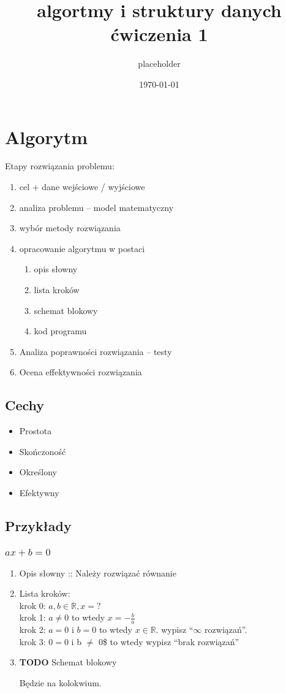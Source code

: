 \documentclass[11pt]{article}
\author{placeholder}
\date{\today}
\title{algortmy i struktury danych ćwiczenia 1}
\begin{document}
\maketitle
\section{Algorytm}
\label{sec:org84e7213}
Etapy rozwiązania problemu:
\begin{enumerate}
\item cel + dane wejściowe / wyjściowe
\item analiza problemu -- model matematyczny
\item wybór metody rozwiązania
\item opracowanie algorytmu w postaci
\begin{enumerate}
\item opis słowny
\item lista kroków
\item schemat blokowy
\item kod programu
\end{enumerate}
\item Analiza poprawności rozwiązania -- testy
\item Ocena effektywności rozwiązania
\end{enumerate}
\subsection{Cechy}
\label{sec:org1003a57}
\begin{itemize}
\item Prostota
\item Skończoność
\item Określony
\item Efektywny
\end{itemize}
\subsection{Przykłady}
\label{sec:org1a3c667}
\subsubsection{\(ax+b=0\)}
\label{sec:org75b39d2}
\begin{enumerate}
\item Opis słowny :: Należy rozwiązać równanie
\label{sec:org49e93ff}
\item Lista kroków:
\label{sec:orgbef407d}
\\[0pt]
krok 0: \(a,b \in \mathbb{R}, x = ?\)
\\[0pt]
krok 1: \(a \ne 0\) to wtedy \(x = - \frac{b}{a}\)
\\[0pt]
krok 2: \(a = 0\) i \(b = 0\) to wtedy \(x \in \mathbb{R}\). wypisz ``\(\infty\) rozwiązań''.
\\[0pt]
krok 3: \(0 = 0\) i b \(\ne\) 0\$ to wtedy wypisz ``brak rozwiązań''
\item {\bfseries\sffamily TODO} Schemat blokowy
\label{sec:orgd95eab2}

Będzie na kolokwium.
\end{enumerate}
\end{document}
